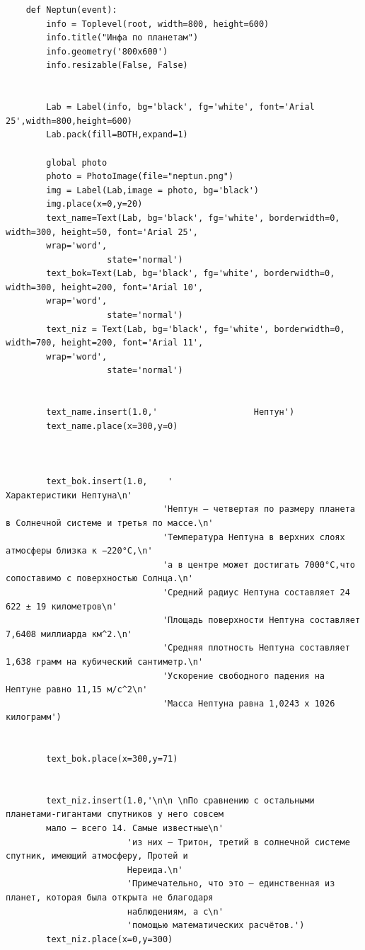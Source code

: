 \documentclass[11pt,a4paper]{report}
\begin{document}
\begin{verbatim}
    def Neptun(event):  
        info = Toplevel(root, width=800, height=600)
        info.title("Инфа по планетам")
        info.geometry('800x600')
        info.resizable(False, False) 
        
        
        Lab = Label(info, bg='black', fg='white', font='Arial 25',width=800,height=600)  
        Lab.pack(fill=BOTH,expand=1)
        
        global photo
        photo = PhotoImage(file="neptun.png")
        img = Label(Lab,image = photo, bg='black')
        img.place(x=0,y=20)
        text_name=Text(Lab, bg='black', fg='white', borderwidth=0, width=300, height=50, font='Arial 25', 
        wrap='word',
                    state='normal')  
        text_bok=Text(Lab, bg='black', fg='white', borderwidth=0, width=300, height=200, font='Arial 10', 
        wrap='word',
                    state='normal')  
        text_niz = Text(Lab, bg='black', fg='white', borderwidth=0, width=700, height=200, font='Arial 11', 
        wrap='word',
                    state='normal')  
    
       
        text_name.insert(1.0,'                   Нептун')
        text_name.place(x=300,y=0)
        
        
        
        text_bok.insert(1.0,    '                                           Характеристики Нептуна\n' 
                               'Нептун – четвертая по размеру планета в Солнечной системе и третья по массе.\n'
                               'Температура Нептуна в верхних слоях атмосферы близка к −220°C,\n'
                               'а в центре может достигать 7000°C,что сопоставимо с поверхностью Солнца.\n'
                               'Средний радиус Нептуна составляет 24 622 ± 19 километров\n'
                               'Площадь поверхности Нептуна составляет 7,6408 миллиарда км^2.\n'
                               'Средняя плотность Нептуна составляет 1,638 грамм на кубический сантиметр.\n'
                               'Ускорение свободного падения на Нептуне равно 11,15 м/c^2\n'
                               'Масса Нептуна равна 1,0243 х 1026 килограмм')
        
        
        text_bok.place(x=300,y=71)        
        
        
        text_niz.insert(1.0,'\n\n \nПо сравнению с остальными планетами-гигантами спутников у него совсем 
        мало – всего 14. Самые известные\n'
                        'из них – Тритон, третий в солнечной системе спутник, имеющий атмосферу, Протей и 
                        Нереида.\n'
                        'Примечательно, что это – единственная из планет, которая была открыта не благодаря 
                        наблюдениям, а с\n'
                        'помощью математических расчётов.')
        text_niz.place(x=0,y=300)
    

\end{verbatim}
\end{document}

